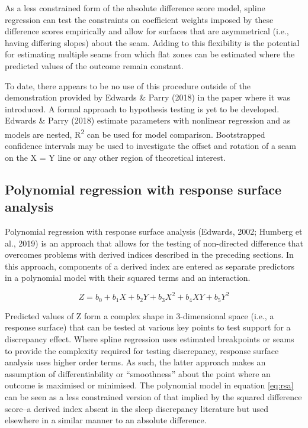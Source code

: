 \documentclass[
]{article}
\begin{document}
As a less constrained form of the absolute difference score model, spline regression can test the constraints on coefficient weights imposed by these difference scores empirically and allow for surfaces that are asymmetrical (i.e., having differing slopes) about the seam. Adding to this flexibility is the potential for estimating multiple seams from which flat zones can be estimated where the predicted values of the outcome remain constant.

To date, there appears to be no use of this procedure outside of the demonstration provided by Edwards \& Parry (2018) in the paper where it was introduced. A formal approach to hypothesis testing is yet to be developed. Edwards \& Parry (2018) estimate parameters with nonlinear regression and as models are nested, R\textsuperscript{2} can be used for model comparison. Bootstrapped confidence intervals may be used to investigate the offset and rotation of a seam on the X = Y line or any other region of theoretical interest.

\subsection{Polynomial regression with response surface analysis}\label{polynomial-regression-with-response-surface-analysis}

Polynomial regression with response surface analysis (Edwards, 2002; Humberg et al., 2019) is an approach that allows for the testing of non-directed difference that overcomes problems with derived indices described in the preceding sections. In this approach, components of a derived index are entered as separate predictors in a polynomial model with their squared terms and an interaction.

\begin{equation}
Z = b_{0} + b_{1}X + b_{2}Y + b_{3}X^{2} + b_{4}XY + b_{5}Y^{2}
\label{eq:rsa}
\end{equation}

Predicted values of Z form a complex shape in 3-dimensional space (i.e., a response surface) that can be tested at various key points to test support for a discrepancy effect. Where spline regression uses estimated breakpoints or seams to provide the complexity required for testing discrepancy, response surface analysis uses higher order terms. As such, the latter approach makes an assumption of differentiability or ``smoothness'' about the point where an outcome is maximised or minimised. The polynomial model in equation \eqref{eq:rsa} can be seen as a less constrained version of that implied by the squared difference score--a derived index absent in the sleep discrepancy literature but used elsewhere in a similar manner to an absolute difference.
\end{document}

